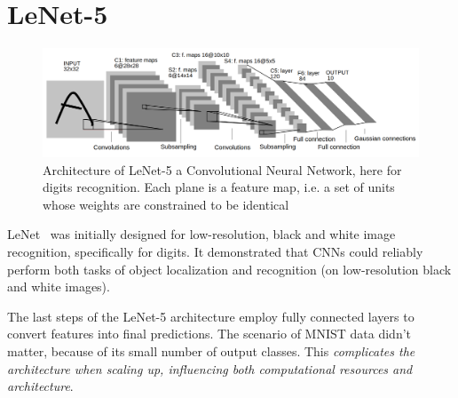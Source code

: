 \documentclass[11pt]{article}
\begin{document}


\tableofcontents

\clearpage

\section{LeNet-5}

\begin{figure}[H]
    \centering
    \includegraphics[width=\linewidth]{figures/LeNetFigure.png}
    \caption{Architecture of LeNet-5 a Convolutional Neural Network, here for digits recognition. Each plane is a feature map, i.e. a set of units
    whose weights are constrained to be identical~\cite{LeNet}}
\end{figure}



LeNet~\cite{LeNet} was initially designed for low-resolution, black and white image recognition, specifically for digits. It demonstrated that CNNs could reliably perform both tasks of object localization and recognition (on low-resolution black and white images).

The last steps of the LeNet-5 architecture employ fully connected layers to convert features into final predictions. The scenario of MNIST data didn't matter, because of its small number of output classes. This \textit{complicates the architecture when scaling up, influencing both computational resources and architecture}.

\printbibliography
\end{document}
